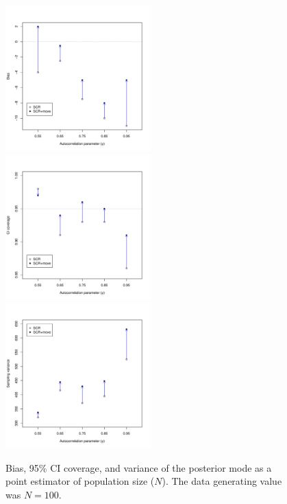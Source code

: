 \documentclass[12pt]{article}
\begin{document}
\begin{figure}[h!]
  \centering
  \includegraphics[width=0.5\textwidth, trim=0mm 15mm 0mm 15mm, clip]{../R/sims/bias-N.pdf} \\
  \includegraphics[width=0.5\textwidth, trim=0mm 15mm 0mm 15mm, clip]{../R/sims/cover-N.pdf} \\
  \includegraphics[width=0.5\textwidth, trim=0mm 15mm 0mm 15mm, clip]{../R/sims/var-N.pdf}
  \caption{Bias, 95\% CI coverage, and variance of the posterior mode
    as a point estimator of population size ($N$). The data generating
    value was $N=100$. } 
  \label{fig:bias}
\end{figure}
\end{document}
